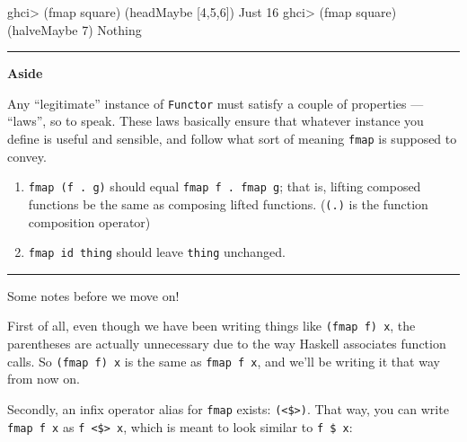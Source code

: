 \documentclass[]{article}
\newenvironment{Shaded}{}{}
\newcommand{\DataTypeTok}[1]{\textcolor[rgb]{0.56,0.13,0.00}{{#1}}}
\newcommand{\DecValTok}[1]{\textcolor[rgb]{0.25,0.63,0.44}{{#1}}}
\newcommand{\FunctionTok}[1]{\textcolor[rgb]{0.02,0.16,0.49}{{#1}}}
\newcommand{\NormalTok}[1]{{#1}}
\begin{document}
\begin{Shaded}
\begin{Highlighting}[]
\NormalTok{ghci}\FunctionTok{>} \NormalTok{(fmap square) (headMaybe [}\DecValTok{4}\NormalTok{,}\DecValTok{5}\NormalTok{,}\DecValTok{6}\NormalTok{])}
\DataTypeTok{Just} \DecValTok{16}
\NormalTok{ghci}\FunctionTok{>} \NormalTok{(fmap square) (halveMaybe }\DecValTok{7}\NormalTok{)}
\DataTypeTok{Nothing}
\end{Highlighting}
\end{Shaded}

\begin{center}\rule{0.5\linewidth}{\linethickness}\end{center}

\textbf{Aside}

Any ``legitimate'' instance of \texttt{Functor} must satisfy a couple of
properties --- ``laws'', so to speak. These laws basically ensure that
whatever instance you define is useful and sensible, and follow what
sort of meaning \texttt{fmap} is supposed to convey.

\begin{enumerate}
\def\labelenumi{\arabic{enumi}.}
\tightlist
\item
  \texttt{fmap\ (f\ .\ g)} should equal \texttt{fmap\ f\ .\ fmap\ g};
  that is, lifting composed functions be the same as composing lifted
  functions. (\texttt{(.)} is the function composition operator)
\item
  \texttt{fmap\ id\ thing} should leave \texttt{thing} unchanged.
\end{enumerate}

\begin{center}\rule{0.5\linewidth}{\linethickness}\end{center}

Some notes before we move on!

First of all, even though we have been writing things like
\texttt{(fmap\ f)\ x}, the parentheses are actually unnecessary due to
the way Haskell associates function calls. So \texttt{(fmap\ f)\ x} is
the same as \texttt{fmap\ f\ x}, and we'll be writing it that way from
now on.

Secondly, an infix operator alias for \texttt{fmap} exists:
\texttt{(\textless{}\$\textgreater{})}. That way, you can write
\texttt{fmap\ f\ x} as \texttt{f\ \textless{}\$\textgreater{}\ x}, which
is meant to look similar to \texttt{f\ \$\ x}:

\begin{Shaded}
\end{Shaded}
\end{document}
